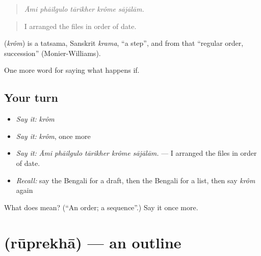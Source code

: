 \begin{quote}
    
\end{quote}

\begin{quote}
\emph{Āmi phāilgulo tārikher krôme sājālām.}
\end{quote}

\begin{quote}
I arranged the files in order of date.
\end{quote}

\begin{cousinweb}
\textbf{} (\emph{krôm}) is a tatsama, Sanskrit \emph{krama}, \textquotedblleft{}a step\textquotedblright{}, and from that \textquotedblleft{}regular order, succession\textquotedblright{} (Monier-Williams).
\end{cousinweb}

\begin{grammarlens}[title={What you've built}]
One more word for saying what happens if.
\end{grammarlens}

\subsection*{Your turn}
\begin{itemize}
\raggedright
  \item \emph{Say it:} \emph{krôm}
  \item \emph{Say it:} \emph{krôm}, once more
  \item \emph{Say it:} \emph{Āmi phāilgulo tārikher krôme sājālām.} — I arranged the files in order of date.
  \item \emph{Recall:} say the Bengali for a draft, then the Bengali for a list, then say \emph{krôm} again
\end{itemize}

\begin{tcolorbox}[breakable,colback=teal!4,colframe=teal!35!black,title={Before you move on}]
What does  mean? (\textquotedblleft{}An order; a sequence\textquotedblright{}.) Say it once more.
\end{tcolorbox}
\section[\texorpdfstring{\bn{রূপরেখা} (rūprekhā)}{রূপরেখা (rūprekhā)}]{ (rūprekhā) — an outline}

\label{lesson:BN-C531-ruprekha}



